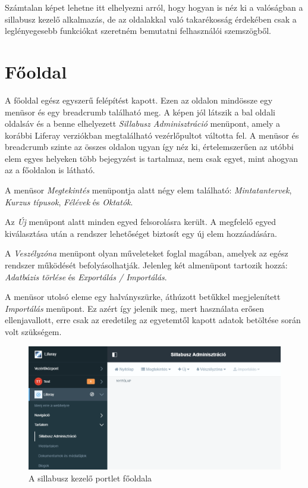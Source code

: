 \documentclass[hidelinks, 12pt, a4paper]{report}
\begin{document}
Számtalan képet lehetne itt elhelyezni arról, hogy hogyan is néz ki a valóságban a sillabusz kezelő alkalmazás, de az oldalakkal való takarékosság érdekében csak a leglényegesebb funkciókat szeretném bemutatni felhasználói szemszögből.

\section{Főoldal}

A főoldal egész egyszerű felépítést kapott. Ezen az oldalon mindössze egy menüsor és egy breadcrumb található meg. A képen jól látszik a bal oldali oldalsáv és a benne elhelyezett \emph{Sillabusz Adminisztráció} menüpont, amely a korábbi Liferay verziókban megtalálható vezérlőpultot váltotta fel. A menüsor és breadcrumb szinte az összes oldalon ugyan így néz ki, értelemszerűen az utóbbi elem egyes helyeken több bejegyzést is tartalmaz, nem csak egyet, mint ahogyan az a főoldalon is látható.

A menüsor \emph{Megtekintés} menüpontja alatt négy elem található: \emph{Mintatantervek}, \emph{Kurzus típusok}, \emph{Félévek} és \emph{Oktatók}.

Az \emph{Új} menüpont alatt minden egyed felsorolásra került. A megfelelő egyed kiválasztása után a rendszer lehetőséget biztosít egy új elem hozzáadására.

A \emph{Veszélyzóna} menüpont olyan műveleteket foglal magában, amelyek az egész rendszer működését befolyásolhatják. Jelenleg két almenüpont tartozik hozzá: \emph{Adatbázis törlése} és \emph{Exportálás / Importálás}.

A menüsor utolsó eleme egy halványszürke, áthúzott betűkkel megjelenített \emph{Importálás} menüpont. Ez azért így jelenik meg, mert használata erősen ellenjavallott, erre csak az eredetileg az egyetemtől kapott adatok betöltése során volt szükségem.

\begin{figure}[H]
    \centering
	\includegraphics[width=\textwidth]{sm_main_page.png}
	\caption{A sillabusz kezelő portlet főoldala}
\end{figure}
\end{document}
